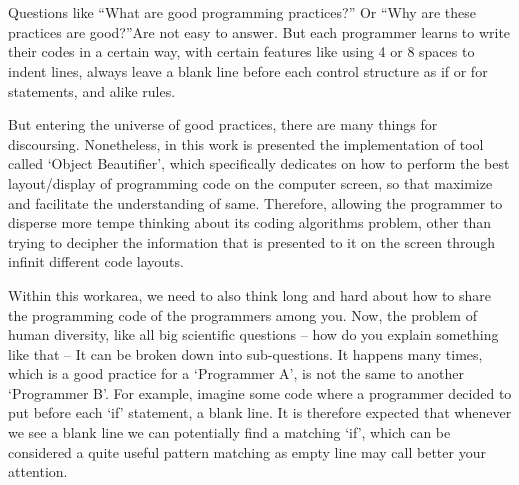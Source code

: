 

%


\chapter{}


\begin{englishtext}

    Questions like ``What are good programming practices?'' Or ``Why are these
    practices are good?''Are not easy to answer. But each programmer learns to
    write their codes in a certain way, with certain features like using 4 or 8
    spaces to indent lines, always leave a blank line before each control
    structure as if or for statements, and alike rules.
    \cite{naturalCodingConventions}

    But entering the universe of good practices, there are many things for
    discoursing. Nonetheless, in this work is presented the implementation of
    tool called `Object Beautifier', which specifically dedicates on how to
    perform the best layout/display of programming code on the computer screen,
    so that maximize and facilitate the understanding of same. Therefore,
    allowing the programmer to disperse more tempe thinking about its coding
    algorithms problem, other than trying to decipher the information that is
    presented to it on the screen through infinit different code layouts.

    Within this work\s area, we need to also think long and hard about how to
    share the programming code of the programmers among you. Now, the problem of
    human diversity, like all big scientific questions -- how do you explain
    something like that -- It can be broken down into sub-questions. It happens
    many times, which is a good practice for a `Programmer A', is not the same
    to another `Programmer B'. For example, imagine some code where a programmer
    decided to put before each `if' statement, a blank line. It is therefore
    expected that whenever we see a blank line we can potentially find a
    matching `if', which can be considered a quite useful pattern matching as
    empty line may call better your attention.


\end{englishtext}
